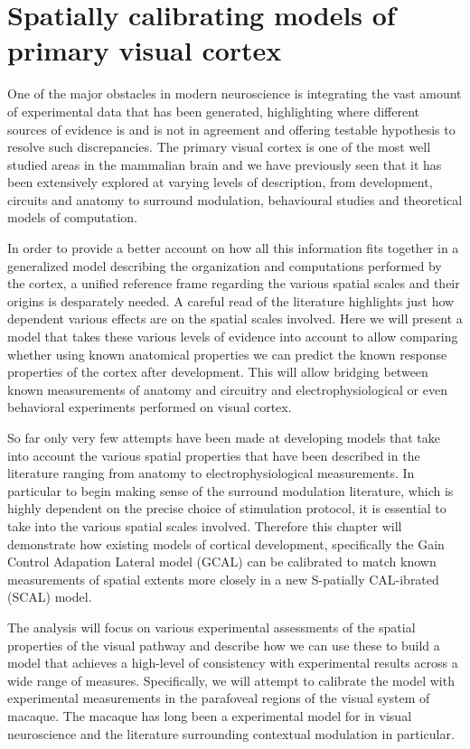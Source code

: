 \chapter{Spatially calibrating models of primary visual cortex}

One of the major obstacles in modern neuroscience is integrating the
vast amount of experimental data that has been generated, highlighting
where different sources of evidence is and is not in agreement and
offering testable hypothesis to resolve such discrepancies. The
primary visual cortex is one of the most well studied areas in the
mammalian brain and we have previously seen that it has been
extensively explored at varying levels of description, from
development, circuits and anatomy to surround modulation, behavioural
studies and theoretical models of computation.

In order to provide a better account on how all this information fits
together in a generalized model describing the organization and
computations performed by the cortex, a unified reference frame
regarding the various spatial scales and their origins is desparately
needed. A careful read of the literature highlights just how dependent
various effects are on the spatial scales involved. Here we will
present a model that takes these various levels of evidence into
account to allow comparing whether using known anatomical properties
we can predict the known response properties of the cortex after
development. This will allow bridging between known measurements of
anatomy and circuitry and electrophysiological or even behavioral
experiments performed on visual cortex.

So far only very few attempts have been made at developing models that
take into account the various spatial properties that have been
described in the literature ranging from anatomy to
electrophysiological measurements. In particular to begin making sense
of the surround modulation literature, which is highly dependent on
the precise choice of stimulation protocol, it is essential to take
into the various spatial scales involved. Therefore this chapter will
demonstrate how existing models of cortical development, specifically
the Gain Control Adapation Lateral model (GCAL) \citep{Stevens2013}
can be calibrated to match known measurements of spatial extents more
closely in a new S-patially CAL-ibrated (SCAL) model.

The analysis will focus on various experimental assessments of the
spatial properties of the visual pathway and describe how we can use
these to build a model that achieves a high-level of consistency with
experimental results across a wide range of measures. Specifically, we
will attempt to calibrate the model with experimental measurements in
the parafoveal regions of the visual system of macaque. The macaque
has long been a experimental model for in visual neuroscience and the
literature surrounding contextual modulation in particular.

